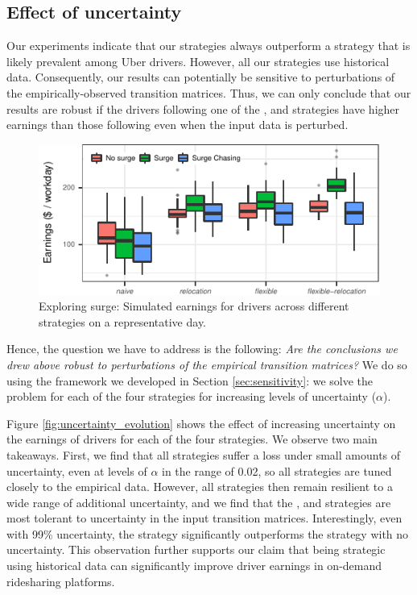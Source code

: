 \subsection{Effect of uncertainty}
\label{sec:effect_of_uncertainty} 
Our experiments indicate that our strategies always outperform a {\naive} strategy that is likely prevalent 
among Uber drivers. However, all our strategies use historical data. Consequently, 
our results can potentially be sensitive to perturbations of the empirically-observed transition matrices. 
Thus, we can only conclude that our results are robust if
the drivers following one of the {\relocation}, {\flexible} and {\relocationflexible} strategies
have higher earnings than those following {\naive} even when the input data is perturbed.
\begin{figure}
	\includegraphics{figures/simulated_earnings.pdf}
	\caption{Exploring surge: Simulated earnings for drivers across different strategies on a representative day.}
	\label{fig:simulated_earnings}
\end{figure}

Hence, the question we have to address is the following: 
\textit{Are the conclusions we drew above robust to perturbations of the empirical transition matrices?} We do so using
the framework we developed in Section \ref{sec:sensitivity}:  
we solve the {\robustproblem} problem for each of the four strategies for increasing levels of uncertainty ($\alpha$).

Figure \ref{fig:uncertainty_evolution} shows the effect of increasing uncertainty on the earnings of drivers for
    each of the four strategies.  We observe two main takeaways.  First, we find that all strategies
   suffer a loss under small amounts of uncertainty, even at levels of $\alpha$ in the range of 0.02, so all
   strategies are tuned closely to the empirical data.  
However, all strategies then remain resilient to a wide range of additional uncertainty, and we find that
   the {\relocation}, {\flexible} and {\relocationflexible} strategies are most tolerant to uncertainty 
  in the input transition matrices. 
Interestingly, even with 99\% uncertainty, the {\relocationflexible} strategy significantly outperforms 
  the {\naive} strategy with no uncertainty.
This observation further supports our claim that being strategic using historical data can significantly improve driver 
  earnings in on-demand ridesharing platforms. 

